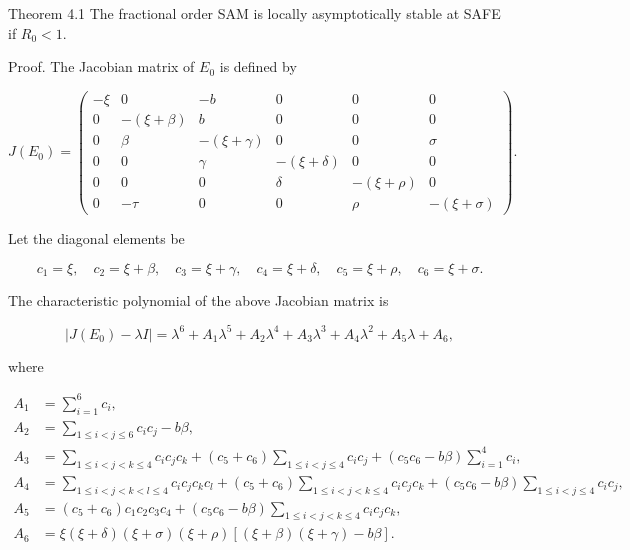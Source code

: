 \documentclass[10pt]{NSP1}
\begin{document}
\par\medskip{}\smallskip

Theorem 4.1 The fractional order SAM is locally asymptotically stable at SAFE if \(R_{0} < 1\).

Proof. The Jacobian matrix of \(E_{0}\) is defined by

\[
J\left( E_{0} \right) = \begin{pmatrix} - \xi & 0 & - b & 0 & 0 & 0 \\
0 & - (\xi + \beta) & b & 0 & 0 & 0 \\
0 & \beta & - (\xi + \gamma) & 0 & 0 & \sigma \\
0 & 0 & \gamma & - (\xi + \delta) & 0 & 0 \\
0 & 0 & 0 & \delta & - (\xi + \rho) & 0 \\
0 & - \tau & 0 & 0 & \rho & - (\xi + \sigma)
\end{pmatrix}.
\]

Let the diagonal elements be

\[
c_{1} = \xi,\quad c_{2} = \xi + \beta,\quad c_{3} = \xi + \gamma,\quad c_{4} = \xi + \delta,\quad c_{5} = \xi + \rho,\quad c_{6} = \xi + \sigma.
\]

The characteristic polynomial of the above Jacobian matrix is

\[
\left| J\left( E_{0} \right) - \lambda I \right| = \lambda^{6} + A_{1}\lambda^{5} + A_{2}\lambda^{4} + A_{3}\lambda^{3} + A_{4}\lambda^{2} + A_{5}\lambda + A_{6},
\]

where

\[
\begin{matrix}
A_{1} & = \sum_{i = 1}^{6}c_{i}, \\
A_{2} & = \sum_{1 \leq i < j \leq 6}^{}c_{i}c_{j} - b\beta, \\
A_{3} & = \sum_{1 \leq i < j < k \leq 4}^{}c_{i}c_{j}c_{k} + \left( c_{5} + c_{6} \right)\sum_{1 \leq i < j \leq 4}^{}c_{i}c_{j} + \left( c_{5}c_{6} - b\beta \right)\sum_{i = 1}^{4}c_{i}, \\
A_{4} & = \sum_{1 \leq i < j < k < l \leq 4}^{}c_{i}c_{j}c_{k}c_{l} + \left( c_{5} + c_{6} \right)\sum_{1 \leq i < j < k \leq 4}^{}c_{i}c_{j}c_{k} + \left( c_{5}c_{6} - b\beta \right)\sum_{1 \leq i < j \leq 4}^{}c_{i}c_{j}, \\
A_{5} & = \left( c_{5} + c_{6} \right)c_{1}c_{2}c_{3}c_{4} + \left( c_{5}c_{6} - b\beta \right)\sum_{1 \leq i < j < k \leq 4}^{}c_{i}c_{j}c_{k}, \\
A_{6} & = \xi(\xi + \delta)(\xi + \sigma)(\xi + \rho)\left\lbrack (\xi + \beta)(\xi + \gamma) - b\beta \right\rbrack.
\end{matrix}
\]
\end{document}
